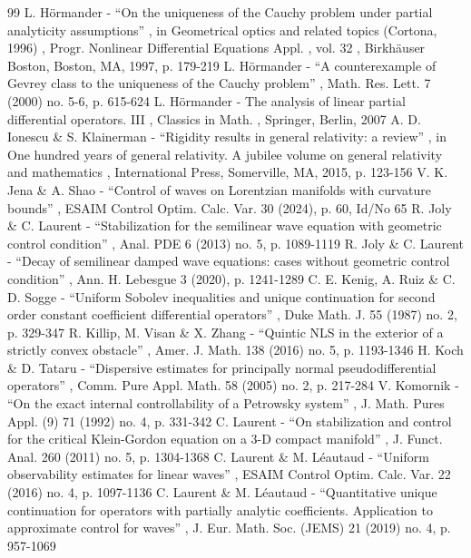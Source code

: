 \documentclass[11pt]{article}
\theoremstyle{definition}
\begin{document}
\begin{thebibliography}{99}
 L. Hörmander - “On the uniqueness of the Cauchy problem under partial analyticity assumptions” , in Geometrical optics and related topics (Cortona, 1996) , Progr. Nonlinear Differential Equations Appl. , vol. 32 , Birkhäuser Boston, Boston, MA, 1997, p. 179-219
 L. Hörmander - “A counterexample of Gevrey class to the uniqueness of the Cauchy problem” , Math. Res. Lett. 7 (2000) no. 5-6, p. 615-624
 L. Hörmander - The analysis of linear partial differential operators. III , Classics in Math. , Springer, Berlin, 2007
 A. D. Ionescu \& S. Klainerman - “Rigidity results in general relativity: a review” , in One hundred years of general relativity. A jubilee volume on general relativity and mathematics , International Press, Somerville, MA, 2015, p. 123-156
 V. K. Jena \& A. Shao - “Control of waves on Lorentzian manifolds with curvature bounds” , ESAIM Control Optim. Calc. Var. 30 (2024), p. 60, Id/No 65
 R. Joly \& C. Laurent - “Stabilization for the semilinear wave equation with geometric control condition” , Anal. PDE 6 (2013) no. 5, p. 1089-1119
 R. Joly \& C. Laurent - “Decay of semilinear damped wave equations: cases without geometric control condition” , Ann. H. Lebesgue 3 (2020), p. 1241-1289
 C. E. Kenig, A. Ruiz \& C. D. Sogge - “Uniform Sobolev inequalities and unique continuation for second order constant coefficient differential operators” , Duke Math. J. 55 (1987) no. 2, p. 329-347
 R. Killip, M. Visan \& X. Zhang - “Quintic NLS in the exterior of a strictly convex obstacle” , Amer. J. Math. 138 (2016) no. 5, p. 1193-1346
 H. Koch \& D. Tataru - “Dispersive estimates for principally normal pseudodifferential operators” , Comm. Pure Appl. Math. 58 (2005) no. 2, p. 217-284
 V. Komornik - “On the exact internal controllability of a Petrowsky system” , J. Math. Pures Appl. (9) 71 (1992) no. 4, p. 331-342
 C. Laurent - “On stabilization and control for the critical Klein-Gordon equation on a 3-D compact manifold” , J. Funct. Anal. 260 (2011) no. 5, p. 1304-1368
 C. Laurent \& M. Léautaud - “Uniform observability estimates for linear waves” , ESAIM Control Optim. Calc. Var. 22 (2016) no. 4, p. 1097-1136
 C. Laurent \& M. Léautaud - “Quantitative unique continuation for operators with partially analytic coefficients. Application to approximate control for waves” , J. Eur. Math. Soc. (JEMS) 21 (2019) no. 4, p. 957-1069

\end{thebibliography}
\end{document}
